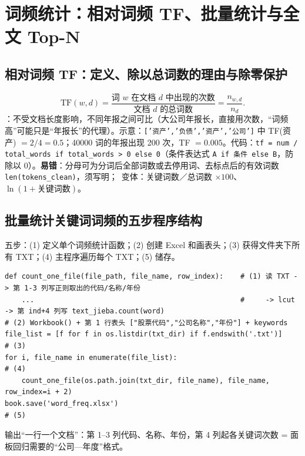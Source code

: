 \section{词频统计：相对词频 TF、批量统计与全文 Top-N}

\subsection{相对词频 TF：定义、除以总词数的理由与除零保护}
\[
\mathrm{TF}(w,d)=\frac{\text{词 } w \text{ 在文档 } d \text{ 中出现的次数}}{\text{文档 } d \text{ 的总词数}}=\frac{n_{w,d}}{n_d}.
\]
：不受文档长度影响，不同年报之间可比（大公司年报长，直接用次数，“词频高”可能只是“年报长”的代理）。示意：\texttt{['资产','负债','资产','公司']} 中 TF(资产) $=2/4=0.5$；40000 词的年报出现 200 次，TF $=0.005$。代码：\texttt{tf = num / total\_words if total\_words > 0 else 0}（条件表达式 \texttt{A if 条件 else B}，防除以 0）。\textbf{易错}：分母可为分词后全部词数或去停用词、去标点后的有效词数 \texttt{len(tokens\_clean)}，须写明；\tagext\ 变体：关键词数／总词数 $\times100$、$\ln(1+\text{关键词数})$。

\subsection{批量统计关键词词频的五步程序结构}
五步：(1) 定义单个词频统计函数；(2) 创建 Excel 和画表头；(3) 获得文件夹下所有 TXT；(4) 主程序遍历每个 TXT；(5) 储存。
\begin{lstlisting}[style=pyD08a]
def count_one_file(file_path, file_name, row_index):    # (1) 读 TXT -> 第 1-3 列写正则取出的代码/名称/年份
    ...                                                 #     -> lcut -> 第 ind+4 列写 text_jieba.count(word)
# (2) Workbook() + 第 1 行表头 ["股票代码","公司名称","年份"] + keywords
file_list = [f for f in os.listdir(txt_dir) if f.endswith('.txt')]                  # (3)
for i, file_name in enumerate(file_list):                                           # (4)
    count_one_file(os.path.join(txt_dir, file_name), file_name, row_index=i + 2)
book.save('word_freq.xlsx')                                                         # (5)
\end{lstlisting}
输出“一行一个文档”：第 1–3 列代码、名称、年份，第 4 列起各关键词次数 = 面板回归需要的“公司—年度”格式。

